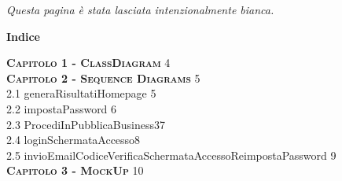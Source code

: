 \documentclass[a4paper,12pt]{article}
\begin{document}
\newpage\null\thispagestyle{empty}
\begin{center}
\vfil
\vfil
\textit{Questa pagina è stata lasciata intenzionalmente bianca. } 
\vfil
\vfil 
\end{center}
\newpage

\newpage\null{}\setcounter{page}{3}
\begin{flushleft}
\vspace*{+1cm}
\begingroup
\fontsize{35pt}{12pt}\selectfont\bf{Indice}
\endgroup
\vspace*{+1cm}

\Large\textsc{\bf Capitolo 1 - ClassDiagram} \hfill 4\\

\Large\textsc{\bf Capitolo 2 - Sequence Diagrams} \hfill 5\\
\hspace{+1cm}\large 2.1 generaRisultatiHomepage \hfill 5\\
\hspace{+1cm}\large 2.2 impostaPassword \hfill 6\\
\hspace{+1cm}\large 2.3 ProcediInPubblicaBusiness3\hfill 7\\
\hspace{+1cm}\large 2.4 loginSchermataAccesso\hfill 8\\
\hspace{+1cm}\large 2.5 invioEmailCodiceVerificaSchermataAccessoReimpostaPassword \hfill 9\\

\Large\textsc{\bf Capitolo 3 - MockUp }\hfill 10\\

\end{flushleft}
\newpage

\newpage\null{}\setcounter{page}{4}
\end{document}
